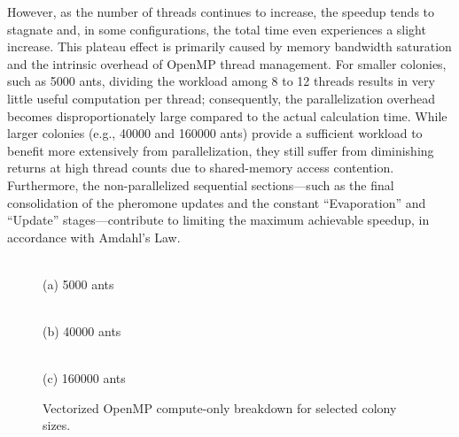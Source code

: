 However, as the number of threads continues to increase, the speedup tends to stagnate and, in some configurations, the total time even experiences a slight increase.
This plateau effect is primarily caused by memory bandwidth saturation and the intrinsic overhead of OpenMP thread management.
For smaller colonies, such as 5000 ants, dividing the workload among 8 to 12 threads results in very little useful computation per thread; consequently, the parallelization overhead becomes disproportionately large compared to the actual calculation time.
While larger colonies (e.g., 40000 and 160000 ants) provide a sufficient workload to benefit more extensively from parallelization, they still suffer from diminishing returns at high thread counts due to shared-memory access contention.
Furthermore, the non-parallelized sequential sections—such as the final consolidation of the pheromone updates and the constant ``Evaporation'' and ``Update'' stages—contribute to limiting the maximum achievable speedup, in accordance with Amdahl's Law.

\begin{figure}[!htbp]
\centering
\begin{minipage}{0.48\columnwidth}
    \centering
    \\[-2mm]
    {\footnotesize (a) 5000 ants}
\end{minipage}
\hfill
\begin{minipage}{0.48\columnwidth}
    \centering
    \\[-2mm]
    {\footnotesize (b) 40000 ants}
\end{minipage}

\vspace{1mm}
\begin{minipage}{0.62\columnwidth}
    \centering
    \\[-2mm]
    {\footnotesize (c) 160000 ants}
\end{minipage}
\caption{Vectorized OpenMP compute-only breakdown for selected colony sizes.}
\label{fig:omp_calc_only_selected}
\end{figure}